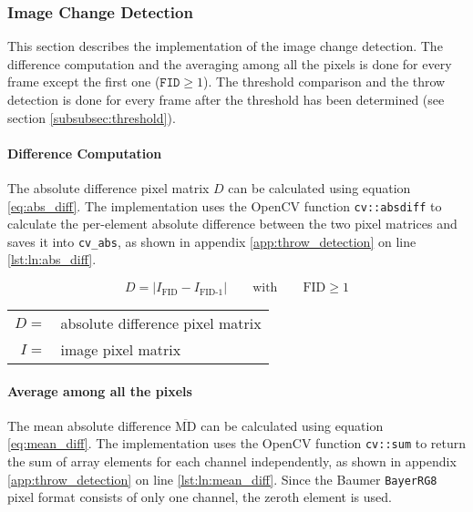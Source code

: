 \subsubsection{Image Change Detection}
\label{subsubsec:image_change_detection}


This section describes the implementation of the image change detection.
The difference computation and the averaging among all the pixels is done for every frame except the first one ($\texttt{FID} \geq 1$).
The threshold comparison and the throw detection is done for every frame after the threshold has been determined (see section \ref{subsubsec:threshold}).

\paragraph{Difference Computation}
The absolute difference pixel matrix $D$ can be calculated using equation \ref{eq:abs_diff}.
The implementation uses the OpenCV function \texttt{cv::absdiff} to calculate the per-element absolute difference between the two pixel matrices and saves it into \texttt{cv\_abs}, as shown in appendix \ref{app:throw_detection} on line \ref{lst:ln:abs_diff}.

\begin{equation}
  D = |I_\text{FID} - I_\text{FID-1}| \quad\quad \text{with} \quad\quad \text{FID} \geq 1
  \label{eq:abs_diff}
\end{equation}

\begin{tabular}{rl}
  $D =$ & absolute difference pixel matrix \\
  $I =$ & image pixel matrix \\
\end{tabular}

\paragraph{Average among all the pixels}
The mean absolute difference $\overline{\text{MD}}$ can be calculated using equation \ref{eq:mean_diff}.
The implementation uses the OpenCV function \texttt{cv::sum} to return the sum of array elements for each channel independently, as shown in appendix \ref{app:throw_detection} on line \ref{lst:ln:mean_diff}.
Since the Baumer \texttt{BayerRG8} pixel format consists of only one channel, the zeroth element is used.

